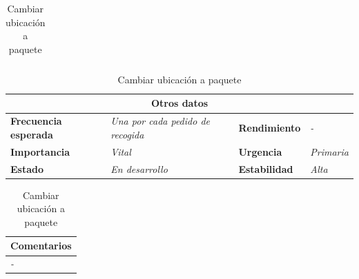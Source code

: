 \documentclass[12pt,spanish]{article}
\begin{document}
\begin{table}[H]
\begin{tabular}{|m{5pt}|m{15.5cm}|}
	\end{tabular}

	
	\vspace{0.5cm}
	
	\begin{tabular}{|m{3.75cm}|m{3.75cm}|m{3.75cm}|m{3.8cm}|}
		\hline
		\multicolumn{4}{|c|}{\textbf{Otros datos}} \\
		\hline
		\textbf{Frecuencia esperada} & \textit{Una por cada pedido de recogida} & \textbf{Rendimiento} & \textit{-} \\
		\hline
		\textbf{Importancia} & \textit{Vital} & \textbf{Urgencia} & \textit{Primaria} \\
		\hline
		\textbf{Estado} & \textit{En desarrollo} & \textbf{Estabilidad} & \textit{Alta} \\
		\hline
	\end{tabular}
	
	\vspace{1cm}
	
	\begin{tabular}{|m{16.2cm}|}
		\hline
		\textbf{Comentarios} \\
		\hline
		\textit{-} \\
		\hline
	\end{tabular}
	
	\caption{Cambiar ubicación a paquete}

\end{table}
\end{document}
